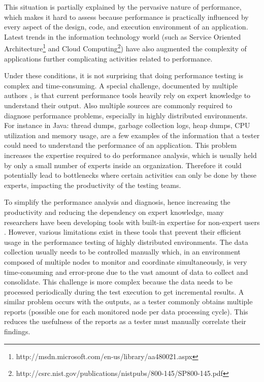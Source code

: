 \documentclass[runningheads,a4paper]{llncs}
\begin{document}
This situation is partially explained by the pervasive nature of
performance, which makes it hard to assess because performance is practically
influenced by every aspect of the design, code, and execution environment
of an application. Latest trends in the information technology world (such as
Service Oriented
Architecture\footnote{http://msdn.microsoft.com/en-us/library/aa480021.aspx} and 
Cloud Computing\footnote{http://csrc.nist.gov/publications/nistpubs/800-145/SP800-145.pdf}) 
have also augmented the complexity of applications further complicating activities related to
performance. 

Under these conditions, it is not surprising that doing performance
testing is complex and time-consuming. A special challenge, documented by
multiple authors \cite{Woodside2007,trevor1,Angelopoulos2012}, is that current
performance tools heavily rely on expert knowledge to understand their output.
Also multiple sources are commonly required to diagnose performance problems,
especially in highly distributed environments. For instance in Java: thread dumps, 
garbage collection logs, heap dumps, CPU utilization and memory usage, are a few
examples of the information that a tester could need to understand the performance 
of an application. This problem increases the expertise required to do
performance analysis, which is usually held by only a small number of experts 
inside an organization\cite{Spear2009}. Therefore it could potentially lead to
bottlenecks where certain activities can only be done by these experts,
impacting the productivity of the testing teams\cite{Angelopoulos2012}.

To simplify the performance analysis and diagnosis, hence increasing the
productivity and reducing the dependency on expert knowledge, many researchers
have been developing tools with built-in expertise for non-expert
users \cite{Altman2010,pat7,Angelopoulos2012}. However, various limitations
exist in these tools that prevent their efficient usage in the performance
testing of highly distributed environments. The data collection usually needs
to be controlled manually which, in an environment composed of multiple nodes to
monitor and coordinate simultaneously, is very time-consuming and error-prone
due to the vast amount of data to collect and consolidate. This challenge is
more complex because the data needs to be processed periodically during the
test execution to get incremental results. A similar problem occurs 
with the outputs, as a tester commonly obtains multiple
reports (possible one for each monitored node per data processing cycle). This
reduces the usefulness of the reports as a tester must manually
correlate their findings.
\end{document}
